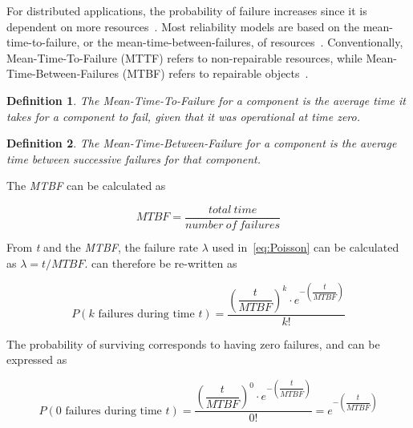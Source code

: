 \documentclass{cslthse-msc}
\newtheorem{definition}{Definition}[chapter]
\begin{document}
For distributed applications, the probability of failure increases since it is dependent on more resources~\cite{relModelDistSimSystem}. Most reliability models are based on the mean-time-to-failure, or the mean-time-between-failures, of resources~\cite{relModelAnalysis}. Conventionally, Mean-Time-To-Failure (MTTF) refers to non-repairable resources, while Mean-Time-Between-Failures (MTBF) refers to repairable objects~\cite{effTaskReplMobGrid}.

\begin{definition} \label{def:mttf}
The Mean-Time-To-Failure for a component is the average time it takes for a component to fail, given that it was operational at time zero.
\end{definition}

\begin{definition} \label{def:MTBF}
The Mean-Time-Between-Failure for a component is the average time between successive failures for that component.
\end{definition}

The \emph{MTBF} can be calculated as

\begin{equation} \label{eq:MTBF}
MTBF = \frac{total\ time}{number\ of\ failures}
\end{equation}

From \emph{t} and the \emph{MTBF}, the failure rate $\lambda$ used in~\cref{eq:Poisson} can be calculated as $\lambda = t/MTBF$.  can therefore be re-written as

\begin{equation} \label{eq:Poisson_during_time_t}
P(k \mbox{ failures during time } t) = \dfrac{\left(\dfrac{t}{MTBF}\right)^k \cdot e^{-\left(\dfrac{t}{MTBF}\right)}}{k!}
\end{equation}

The probability of surviving corresponds to having zero failures, and can be expressed as

\begin{equation} \label{eq:Poisson_no_failures}
P(0 \mbox{ failures during time } t) = \dfrac{\left(\dfrac{t}{MTBF}\right)^0 \cdot e^{-\left(\dfrac{t}{MTBF}\right)}}{0!} = e^{-\left(\dfrac{t}{MTBF}\right)}
\end{equation}
\end{document}
